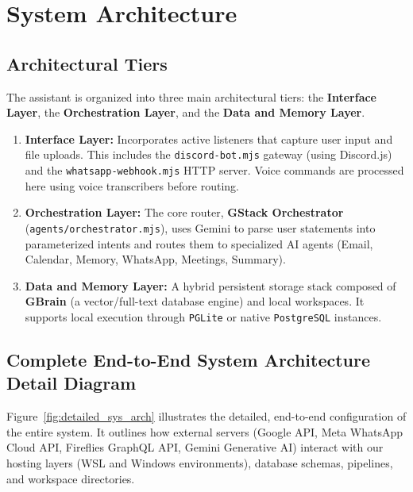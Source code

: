 \documentclass[12pt,a4paper]{report}
\begin{document}
\chapter{System Architecture}
\label{chap:architecture}

\section{Architectural Tiers}
The assistant is organized into three main architectural tiers: the \textbf{Interface Layer}, the \textbf{Orchestration Layer}, and the \textbf{Data and Memory Layer}. 

\begin{enumerate}
    \item \textbf{Interface Layer:} Incorporates active listeners that capture user input and file uploads. This includes the \texttt{discord-bot.mjs} gateway (using Discord.js) and the \texttt{whatsapp-webhook.mjs} HTTP server. Voice commands are processed here using voice transcribers before routing.
    \item \textbf{Orchestration Layer:} The core router, \textbf{GStack Orchestrator} (\texttt{agents/orchestrator.mjs}), uses Gemini to parse user statements into parameterized intents and routes them to specialized AI agents (Email, Calendar, Memory, WhatsApp, Meetings, Summary).
    \item \textbf{Data and Memory Layer:} A hybrid persistent storage stack composed of \textbf{GBrain} (a vector/full-text database engine) and local workspaces. It supports local execution through \texttt{PGLite} or native \texttt{PostgreSQL} instances.
\end{enumerate}

\section{Complete End-to-End System Architecture Detail Diagram}
Figure~\ref{fig:detailed_sys_arch} illustrates the detailed, end-to-end configuration of the entire system. It outlines how external servers (Google API, Meta WhatsApp Cloud API, Fireflies GraphQL API, Gemini Generative AI) interact with our hosting layers (WSL and Windows environments), database schemas, pipelines, and workspace directories.
\end{document}
